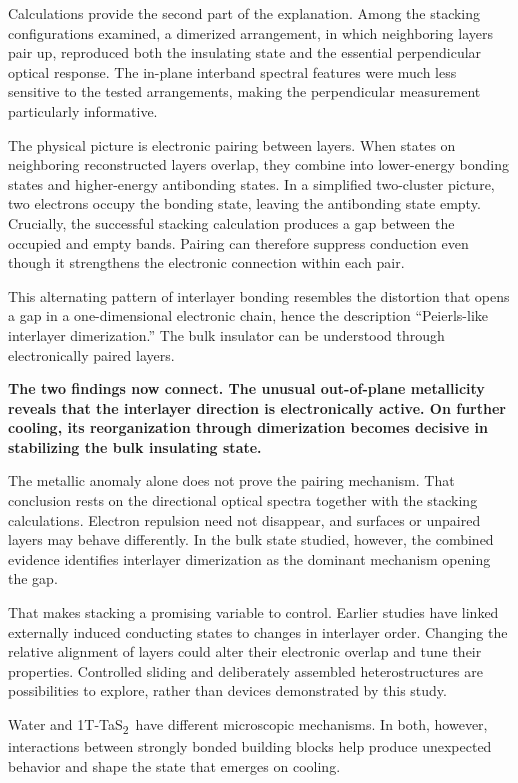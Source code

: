 \documentclass[11pt,a4paper]{article}
\newcommand{\TaS}{1T-TaS\textsubscript{2}}
\begin{document}
Calculations provide the second part of the explanation. Among the stacking configurations examined, a dimerized arrangement, in which neighboring layers pair up, reproduced both the insulating state and the essential perpendicular optical response. The in-plane interband spectral features were much less sensitive to the tested arrangements, making the perpendicular measurement particularly informative.

The physical picture is electronic pairing between layers. When states on neighboring reconstructed layers overlap, they combine into lower-energy bonding states and higher-energy antibonding states. In a simplified two-cluster picture, two electrons occupy the bonding state, leaving the antibonding state empty. Crucially, the successful stacking calculation produces a gap between the occupied and empty bands. Pairing can therefore suppress conduction even though it strengthens the electronic connection within each pair.

This alternating pattern of interlayer bonding resembles the distortion that opens a gap in a one-dimensional electronic chain, hence the description ``Peierls-like interlayer dimerization.'' The bulk insulator can be understood through electronically paired layers.
\newpage 

\textbf{The two findings now connect. The unusual out-of-plane metallicity reveals that the interlayer direction is electronically active. On further cooling, its reorganization through dimerization becomes decisive in stabilizing the bulk insulating state.}

The metallic anomaly alone does not prove the pairing mechanism. That conclusion rests on the directional optical spectra together with the stacking calculations. Electron repulsion need not disappear, and surfaces or unpaired layers may behave differently. In the bulk state studied, however, the combined evidence identifies interlayer dimerization as the dominant mechanism opening the gap.

That makes stacking a promising variable to control. Earlier studies have linked externally induced conducting states to changes in interlayer order. Changing the relative alignment of layers could alter their electronic overlap and tune their properties. Controlled sliding and deliberately assembled heterostructures are possibilities to explore, rather than devices demonstrated by this study.

Water and \TaS\ have different microscopic mechanisms. In both, however, interactions between strongly bonded building blocks help produce unexpected behavior and shape the state that emerges on cooling.
\end{document}
